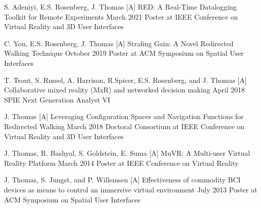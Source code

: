 \setcounter{npubs}{1}
\begin{cvpubs}
  \cvpub
    {S. Adeniyi, E.S. Rosenberg, J. Thomas} %
    {[A\thenpubs] RED: A Real-Time Datalogging Toolkit for Remote Experiments} %
    {March 2021} %
    {Poster at IEEE Conference on Virtual Reality and 3D User Interfaces} %
    
  \cvpub
    {C. You, E.S. Rosenberg, J. Thomas} %
    {[A\thenpubs] Strafing Gain: A Novel Redirected Walking Technique} %
    {October 2019} %
    {Poster at ACM Symposium on Spatial User Interfaces} %
    
  \cvpub
    {T. Trout, S. Russel, A. Harrison, R.Spicer, E.S. Rosenberg, and J. Thomas} %
    {[A\thenpubs] Collaborative mixed reality (MxR) and networked decision making} %
    {April 2018} %
    {SPIE Next Generation Analyst VI} %
      
  \cvpub
    {J. Thomas} %
    {[A\thenpubs] Leveraging Configuration Spaces and Navigation Functions for Redirected Walking} %
    {March 2018} %
    {Doctoral Consortium at IEEE Conference on Virtual Reality and 3D User Interfaces} %
    
  \cvpub
    {J. Thomas, R. Bashyal, S. Goldstein, E. Suma} %
    {[A\thenpubs] MuVR: A Multi-user Virtual Reality Platform} %
    {March 2014} %
    {Poster at IEEE Conference on Virtual Reality} %
    
  \cvpub
    {J. Thomas, S. Jungst, and P. Willemsen} %
    {[A\thenpubs] Effectiveness of commodity BCI devices as means to control an immersive virtual environment} %
    {July 2013} %
    {Poster at ACM Symposium on Spatial User Interfaces} %
\end{cvpubs}
